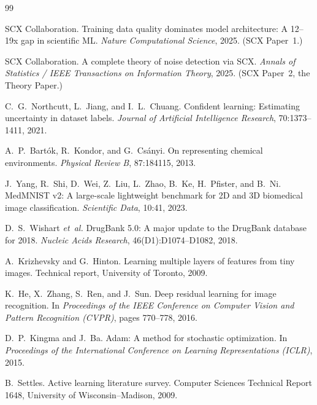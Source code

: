 \documentclass{article}
\begin{document}

\begin{thebibliography}{99}

SCX Collaboration. Training data quality dominates model architecture: A 12--19x gap in scientific ML. \textit{Nature Computational Science}, 2025. (SCX Paper~1.)

SCX Collaboration. A complete theory of noise detection via SCX. \textit{Annals of Statistics / IEEE Transactions on Information Theory}, 2025. (SCX Paper~2, the Theory Paper.)

C.~G.~Northcutt, L.~Jiang, and I.~L.~Chuang. Confident learning: Estimating uncertainty in dataset labels. \textit{Journal of Artificial Intelligence Research}, 70:1373--1411, 2021.

A.~P.~Bart\'{o}k, R.~Kondor, and G.~Cs\'{a}nyi. On representing chemical environments. \textit{Physical Review B}, 87:184115, 2013.

J.~Yang, R.~Shi, D.~Wei, Z.~Liu, L.~Zhao, B.~Ke, H.~Pfister, and B.~Ni. MedMNIST v2: A large-scale lightweight benchmark for 2D and 3D biomedical image classification. \textit{Scientific Data}, 10:41, 2023.

D.~S.~Wishart \textit{et~al.} DrugBank 5.0: A major update to the DrugBank database for 2018. \textit{Nucleic Acids Research}, 46(D1):D1074--D1082, 2018.

A.~Krizhevsky and G.~Hinton. Learning multiple layers of features from tiny images. Technical report, University of Toronto, 2009.

K.~He, X.~Zhang, S.~Ren, and J.~Sun. Deep residual learning for image recognition. In \textit{Proceedings of the IEEE Conference on Computer Vision and Pattern Recognition (CVPR)}, pages 770--778, 2016.

D.~P.~Kingma and J.~Ba. Adam: A method for stochastic optimization. In \textit{Proceedings of the International Conference on Learning Representations (ICLR)}, 2015.

B.~Settles. Active learning literature survey. Computer Sciences Technical Report 1648, University of Wisconsin--Madison, 2009.


\end{thebibliography}
\end{document}
